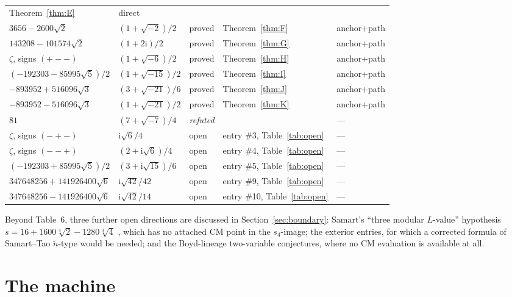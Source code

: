 \documentclass[11pt]{article}
\newcommand{\ii}{\mathrm{i}}
\theoremstyle{definition}
\theoremstyle{remark}
\begin{document}
\begin{table}[htb]
\begin{tabular}{lllll}
  Theorem~\ref{thm:E} & direct\\
$3656-2600\sqrt2$ & $(1+\sqrt{-2})/2$ & proved & Theorem~\ref{thm:F}
  & anchor+path\\
$143208-101574\sqrt2$ & $(1+2\ii)/2$ & proved & Theorem~\ref{thm:G}
  & anchor+path\\
$\zeta$, signs $({+}{-}{-})$ & $(1+\sqrt{-6})/2$ & proved &
  Theorem~\ref{thm:H} & anchor+path\\
$(-192303-85995\sqrt5)/2$ & $(1+\sqrt{-15})/2$ & proved &
  Theorem~\ref{thm:I} & anchor+path\\
$-893952+516096\sqrt3$ & $(3+\sqrt{-21})/6$ & proved &
  Theorem~\ref{thm:J} & anchor+path\\
$-893952-516096\sqrt3$ & $(1+\sqrt{-21})/2$ & proved &
  Theorem~\ref{thm:K} & anchor+path\\
\midrule
$81$ & $(7+\sqrt{-7})/4$ & \emph{refuted} & \cite{Zf2} & ---\\
\midrule
$\zeta$, signs $({-}{+}{-})$ & $\ii\sqrt6/4$ & open & entry \#3,
  Table~\ref{tab:open} & ---\\
$\zeta$, signs $({-}{-}{+})$ & $(2+\ii\sqrt6)/4$ & open & entry \#4,
  Table~\ref{tab:open} & ---\\
$(-192303+85995\sqrt5)/2$ & $(3+\ii\sqrt{15})/6$ & open & entry \#5,
  Table~\ref{tab:open} & ---\\
$347648256+141926400\sqrt6$ & $\ii\sqrt{42}/42$ & open & entry \#9,
  Table~\ref{tab:open} & ---\\
$347648256-141926400\sqrt6$ & $\ii\sqrt{42}/14$ & open & entry \#10,
  Table~\ref{tab:open} & ---\\
\bottomrule
\end{tabular}
\end{table}

Beyond Table~6, three further open directions are discussed in
Section~\ref{sec:boundary}: Samart's ``three modular $L$-value''
hypothesis $s=16+1600\sqrt[3]2-1280\sqrt[3]4$ \cite{Sa15}, which has
no attached CM point in the $s_4$-image; the exterior entries, for
which a corrected formula of Samart--Tao $\widetilde n$-type \cite{ST}
would be needed; and the Boyd-lineage two-variable conjectures, where
no CM evaluation is available at all.

\section{The machine}\label{sec:machine}
\end{document}
